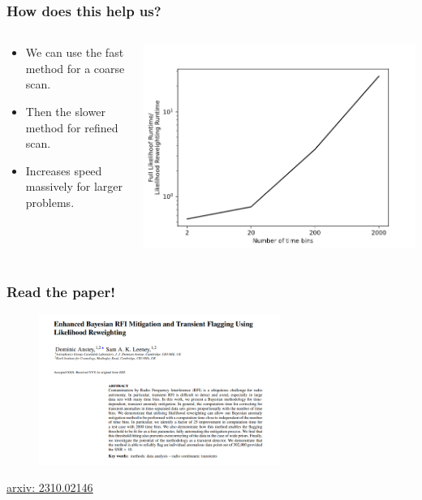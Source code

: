 \documentclass[aspectratio=169]{beamer}
\begin{document}
    \begin{frame}
      \frametitle{How does this help us?}
      \begin{columns}
      \begin{column}{0.5\textwidth}
        \begin{itemize}
          \item We can use the fast method for a coarse scan.
          \item Then the slower method for refined scan.
          \item Increases speed massively for larger problems.
      \end{itemize}
    \end{column}
    \begin{column}{0.5\textwidth}
      \includegraphics[width=1\textwidth]{images/lrw_runtime.png}
    \end{column}
  \end{columns}
  \end{frame}

    \begin{frame}
      \frametitle{Read the paper!}
      \begin{figure}
      \includegraphics[width=0.7\textwidth]{images/da_sl_paper.png}
    \end{figure}
    \href{https://arxiv.org/abs/2310.02146}{arxiv: 2310.02146}

    \end{frame}
\end{document}

